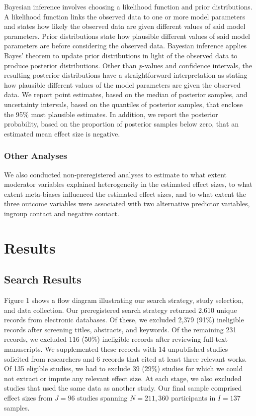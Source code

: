 \documentclass[twocolumn, 11pt, letterpaper]{article}
\begin{document}
Bayesian inference involves choosing a likelihood function and prior
distributions. A likelihood function links the observed data to one or
more model parameters and states how likely the observed data are given
different values of said model parameters. Prior distributions state how
plausible different values of said model parameters are before
considering the observed data. Bayesian inference applies Bayes' theorem
to update prior distributions in light of the observed data to produce
posterior distributions. Other than \emph{p}-values and confidence
intervals, the resulting posterior distributions have a straightforward
interpretation as stating how plausible different values of the model
parameters are given the observed data. We report point estimates, based
on the median of posterior samples, and uncertainty intervals, based on
the quantiles of posterior samples, that enclose the 95\% most plausible
estimates. In addition, we report the posterior probability, based on
the proportion of posterior samples below zero, that an estimated mean
effect size is negative.

\hypertarget{other-analyses}{%
\subsubsection{Other Analyses}\label{other-analyses}}

We also conducted non-preregistered analyses to estimate to what extent
moderator variables explained heterogeneity in the estimated effect
sizes, to what extent meta-biases influenced the estimated effect sizes,
and to what extent the three outcome variables were associated with two
alternative predictor variables, ingroup contact and negative contact.

\hypertarget{results}{%
\section{Results}\label{results}}

\hypertarget{search-results}{%
\subsection{Search Results}\label{search-results}}

Figure 1 shows a flow diagram illustrating our search strategy, study
selection, and data collection. Our preregistered search strategy
returned 2,610 unique records from electronic databases. Of these, we
excluded 2,379 (91\%) ineligible records after screening titles,
abstracts, and keywords. Of the remaining 231 records, we excluded 116
(50\%) ineligible records after reviewing full-text manuscripts. We
supplemented these records with 14 unpublished studies solicited from
researchers and 6 records that cited at least three relevant works. Of
135 eligible studies, we had to exclude 39 (29\%) studies for which we
could not extract or impute any relevant effect size. At each stage, we
also excluded studies that used the same data as another study. Our
final sample comprised effect sizes from \(J = 96\) studies spanning
\(N = 211,360\) participants in \(I = 137\) samples.
\end{document}
